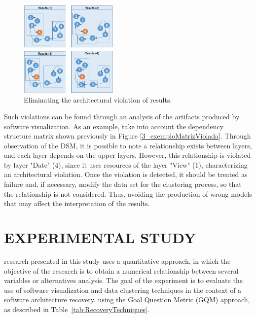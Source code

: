 \documentclass{sig-alternate-05-2015}
\begin{document}
\begin{figure}[!h]
	\centering
	\includegraphics[width=0.43\textwidth]{exemplo_comparacao_modelos_2_en}
	\caption{Eliminating the architectural violation of results.}
	\label{exemplo_comparacao_modelos2}
\end{figure}

Such violations can be found through an analysis of the artifacts produced by software visualization. As an example, take into account the dependency structure matrix shown previously in Figure \ref{3_exemploMatrizViolada}. Through observation of the DSM, it is possible to note a relationship exists between layers, and each layer depends on the upper layers. However, this relationship is violated by layer "Date" (4), since it uses resources of the layer  "View" (1), characterizing an architectural violation. Once the violation is detected, it should be treated as failure and, if necessary, modify the data set for the clustering process, so that the relationship is not considered. Thus, avoiding the production of wrong models that may affect the interpretation of the results.

\section{EXPERIMENTAL STUDY}\label{sec:experimental}

  research presented in this  study uses a quantitative approach, in which the objective of the research 
is to obtain a numerical relationship between several variables or alternatives analysis. The goal of the experiment is to evaluate the use of software visualization and data 
clustering techniques in the context of a software architecture recovery.  using the 
Goal Question Metric (GQM) approach, as described in Table~\ref{tab:RecoveryTechniques}.
\end{document}
